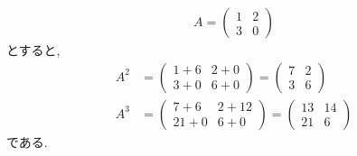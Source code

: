 \begin{example}
  \begin{align*}
    A=\begin{pmatrix}1&2\\3&0\end{pmatrix}
  \end{align*}
  とすると,
  \begin{align*}
    A^2&=\begin{pmatrix}1+6&2+0\\3+0&6+0\end{pmatrix}
    =\begin{pmatrix}7&2\\3&6\end{pmatrix}\\
    A^3&=\begin{pmatrix}7+6&2+12\\21+0&6+0\end{pmatrix}
    =\begin{pmatrix}13&14\\21&6\end{pmatrix}
  \end{align*}
  である.
\end{example}

